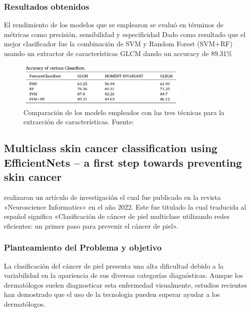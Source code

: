 \subsubsection{Resultados obtenidos}
El rendimiento de los modelos que se emplearon se evaluó en términos de métricas como precisión, sensibilidad y especificidad
Dado como resultado que el mejor clasificador fue la combinación de SVM y Random Forest (SVM+RF) usando un extractor de características GLCM dando un accuracy de 89.31\% 
\begin{figure}[h]
	\begin{center}
		\includegraphics[width=0.75\textwidth]{2/figuras/Tecnica_Diagnosis_skin_cancer_imagen_01.png}
		\caption{Comparación de los modelo empleados con las  tres técnicas para la extracción de características. Fuente: \cite{murugan_2021diagnosis}}
		\label{1:fig 9}
	\end{center}
\end{figure}






\subsection{Multiclass skin cancer classification using EfficientNets – a first step towards preventing skin cancer \citep*{ali_2022multiclass}}
\citeauthor{ali_2022multiclass} realizaron un artículo de investigación el cual fue publicado en la revista «Neuroscience Informatics» en el año 2022. Este fue titulado  la cual traducida al español significa «Clasificación de cáncer de piel multiclase utilizando redes eficientes: un primer paso para prevenir el cáncer de piel».




\subsubsection{Planteamiento del Problema y objetivo}

La clasificación del cáncer de piel presenta una alta dificultad debido a la variabilidad en la apariencia de sus diversas categorías diagnósticas. Aunque los dermatólogos suelen diagnosticar esta enfermedad visualmente, estudios recientes han demostrado que el uso de la  tecnologia pueden superar ayudar a los dermatólogos.


